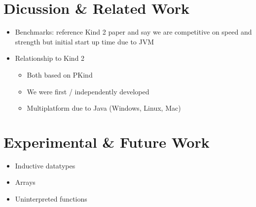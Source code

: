 \documentclass{article}
\begin{document}
\section{Dicussion \& Related Work}

\begin{itemize}
\item Benchmarks: reference Kind 2 paper and say we are competitive on
  speed and strength but initial start up time due to JVM
\item Relationship to Kind 2~\cite{champion2016cav}
  \begin{itemize}
  \item Both based on PKind
  \item We were first / independently developed
  \item Multiplatform due to Java (Windows, Linux, Mac)
  \end{itemize}
\end{itemize}

\section{Experimental \& Future Work}

\begin{itemize}
\item Inductive datatypes
\item Arrays
\item Uninterpreted functions
\end{itemize}

{}

\end{document}
